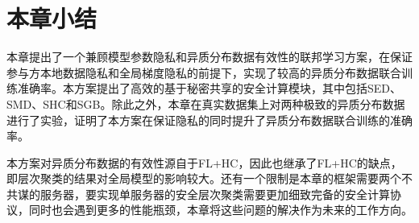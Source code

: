 \section{本章小结}\label{4-conclusion}
本章提出了一个兼顾模型参数隐私和异质分布数据有效性的联邦学习方案，在保证参与方本地数据隐私和全局梯度隐私的前提下，实现了较高的异质分布数据联合训练准确率。本方案提出了高效的基于秘密共享的安全计算模块，其中包括SED、SMD、SHC和SGB。除此之外，本章在真实数据集上对两种极致的异质分布数据进行了实验，证明了本方案在保证隐私的同时提升了异质分布数据联合训练的准确率。

本方案对异质分布数据的有效性源自于FL+HC\cite{briggs2020federated}，因此也继承了FL+HC的缺点，即层次聚类的结果对全局模型的影响较大。还有一个限制是本章的框架需要两个不共谋的服务器，要实现单服务器的安全层次聚类需要更加细致完备的安全计算协议，同时也会遇到更多的性能瓶颈，本章将这些问题的解决作为未来的工作方向。